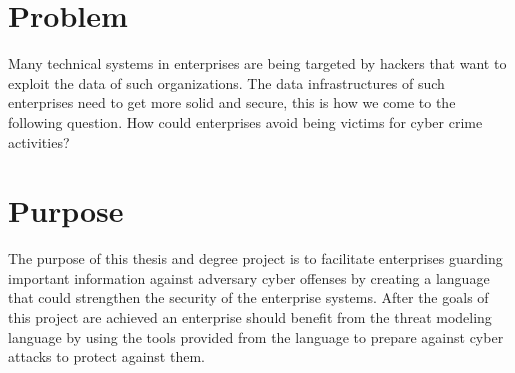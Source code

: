 \documentclass[english]{kththesis}
\begin{document}
\section{Problem}

Many technical systems in enterprises are being targeted by hackers that want to exploit the data of such organizations. The data infrastructures of such enterprises need to get more solid and secure, this is how we come to the following question. How could enterprises avoid being victims for cyber crime activities?

\section{Purpose}
The purpose of this thesis and degree project is to facilitate enterprises guarding important information against adversary cyber offenses by creating a language that could strengthen the security of the enterprise systems. After the goals of this project are achieved an enterprise should benefit from the threat modeling language by using the tools provided from the language to prepare against cyber attacks to protect against them.
\end{document}
